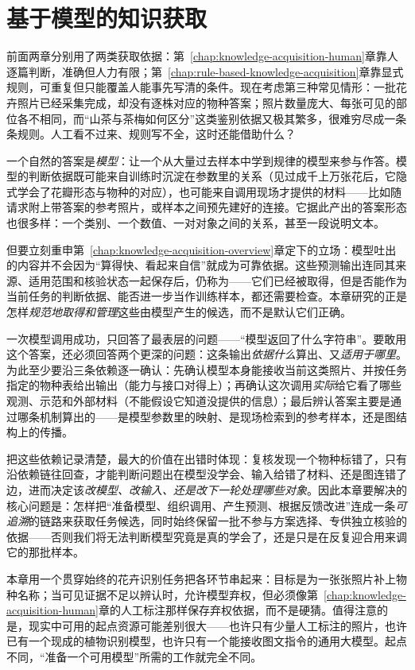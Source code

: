 \chapter{基于模型的知识获取}
\label{chap:knowledge-acquisition-model-based}

前面两章分别用了两类获取依据：第~\ref{chap:knowledge-acquisition-human}章靠人逐篇判断，准确但人力有限；第~\ref{chap:rule-based-knowledge-acquisition}章靠显式规则，可重复但只能覆盖人能事先写清的条件。现在考虑第三种常见情形：一批花卉照片已经采集完成，却没有逐株对应的物种答案；照片数量庞大、每张可见的部位各不相同，而“山茶与茶梅如何区分”这类鉴别依据又极其繁多，很难穷尽成一条条规则。人工看不过来、规则写不全，这时还能借助什么？

一个自然的答案是\emph{模型}：让一个从大量过去样本中学到规律的模型来参与作答。模型的判断依据既可能来自训练时沉淀在参数里的关系（见过成千上万张花后，它隐式学会了花瓣形态与物种的对应），也可能来自调用现场才提供的材料——比如随请求附上带答案的参考照片，或样本之间预先建好的连接。它据此产出的答案形态也很多样：一个类别、一个数值、一对对象之间的关系，甚至一段说明文本。

但要立刻重申第~\ref{chap:knowledge-acquisition-overview}章定下的立场：模型吐出的内容并不会因为“算得快、看起来自信”就成为可靠依据。这些预测输出连同其来源、适用范围和核验状态一起保存后，仍称为——它们已经被取得，但是否能作为当前任务的判断依据、能否进一步当作训练样本，都还需要检查。本章研究的正是怎样\emph{规范地取得和管理}这些由模型产生的候选，而不是默认它们正确。

一次模型调用成功，只回答了最表层的问题——“模型返回了什么字符串”。要敢用这个答案，还必须回答两个更深的问题：这条输出\emph{依据什么}算出、又\emph{适用于哪里}。为此至少要沿三条依赖逐一确认：先确认模型本身能接收当前这类照片、并按任务指定的物种表给出输出（能力与接口对得上）；再确认这次调用\emph{实际}给它看了哪些观测、示范和外部材料（不能假设它知道没提供的信息）；最后辨认答案主要是通过哪条机制算出的——是模型参数里的映射、是现场检索到的参考样本，还是图结构上的传播。

把这些依赖记录清楚，最大的价值在出错时体现：复核发现一个物种标错了，只有沿依赖链往回查，才能判断问题出在模型没学会、输入给错了材料、还是图连错了边，进而决定该\emph{改模型、改输入、还是改下一轮处理哪些对象}。因此本章要解决的核心问题是：怎样把“准备模型、组织调用、产生预测、根据反馈改进”连成一条\emph{可追溯}的链路来获取任务候选，同时始终保留一批不参与方案选择、专供独立核验的依据——否则我们将无法判断模型究竟是真的学会了，还是只是在反复迎合用来调它的那批样本。

本章用一个贯穿始终的花卉识别任务把各环节串起来：目标是为一张张照片补上物种名称；当可见证据不足以辨认时，允许模型弃权，但必须像第~\ref{chap:knowledge-acquisition-human}章的人工标注那样保存弃权依据，而不是硬猜。值得注意的是，现实中可用的起点资源可能差别很大——也许只有少量人工标注的照片，也许已有一个现成的植物识别模型，也许只有一个能接收图文指令的通用大模型。起点不同，“准备一个可用模型”所需的工作就完全不同。

